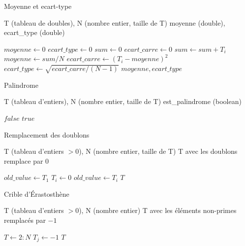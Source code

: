 \documentclass[a4paper]{article}
\DeclarePairedDelimiter\floor{\lfloor}{\rfloor}
\theoremstyle{definition}
\begin{document}
\begin{algorithm}[h!]
    \caption{Moyenne et ecart-type}\label{alg:cap}
    \Entree T (tableau de doubles), N (nombre entier, taille de T)
    \Sortie moyenne (double), ecart\_type (double)
    \begin{algorithmic}[1]
    \State $moyenne \gets 0$
    \State $ ecart\_type \gets 0$
    \State $sum \gets 0$
    \State $ecart\_carre \gets 0$
    \State $sum \gets sum + T_i$
    \EndFor
    \State $moyenne \gets sum/N$
    \State $ecart\_carre \gets (T_i - moyenne)^2$
    \EndFor
    \State $ecart\_type \gets \sqrt{ecart\_carre/(N-1)}$
    \State \Return $moyenne, ecart\_type$
    \end{algorithmic}
\end{algorithm}

\begin{algorithm}[t!]
    \caption{Palindrome}\label{alg:cap}
    \Entree T (tableau d'entiers), N (nombre entier, taille de T)
    \Sortie est\_palindrome (boolean)
    \begin{algorithmic}[1]
    \State \Return $false$
    \EndIf
    \EndFor
    \State \Return $true$
    \end{algorithmic}
\end{algorithm}

\begin{algorithm}[t!]
    \caption{Remplacement des doublons}\label{alg:cap}
    \Entree T (tableau d'entiers $> 0$), N (nombre entier, taille de T)
    \Sortie T avec les doublons remplace par 0
    \begin{algorithmic}[1]
    \State $old\_value \gets T_1$
    \State $T_i \gets 0$
    \Else
    \State $old\_value \gets T_i$
    \EndIf
    \EndFor
    \State \Return $T$
    \end{algorithmic}
\end{algorithm}

\setcounter{algorithm}{6}
\begin{algorithm}[t]
    \caption{Crible d'\'Erastosth\`ene}\label{alg:cap}
    \Entree T (tableau d'entiers $> 0$), N (nombre entier)
    \Sortie T avec les \'el\'ements non-primes remplac\'es par $-1$
    \begin{algorithmic}[1]
    \State $T \gets 2:N$
    \State $T_j \gets -1$
    \EndIf
    \EndFor
    \EndFor
    \State \Return $T$
    \end{algorithmic}
\end{algorithm}
\end{document}
